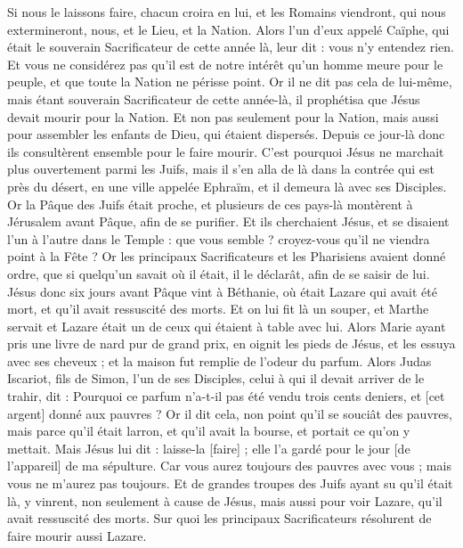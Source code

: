 \begin{multicols}{2}
Si nous le laissons faire, chacun croira en lui, et les Romains viendront, qui nous extermineront, nous, et le Lieu, et la Nation.
Alors l'un d'eux appelé Caïphe, qui était le souverain Sacrificateur de cette année là, leur dit : vous n'y entendez rien.
Et vous ne considérez pas qu'il est de notre intérêt qu'un homme meure pour le peuple, et que toute la Nation ne périsse point.
Or il ne dit pas cela de lui-même, mais étant souverain Sacrificateur de cette année-là, il prophétisa que Jésus devait mourir pour la Nation.
Et non pas seulement pour la Nation, mais aussi pour assembler les enfants de Dieu, qui étaient dispersés.
Depuis ce jour-là donc ils consultèrent ensemble pour le faire mourir.
C'est pourquoi Jésus ne marchait plus ouvertement parmi les Juifs, mais il s'en alla de là dans la contrée qui est près du désert, en une ville appelée Ephraïm, et il demeura là avec ses Disciples.
Or la Pâque des Juifs était proche, et plusieurs de ces pays-là montèrent à Jérusalem avant Pâque, afin de se purifier.
Et ils cherchaient Jésus, et se disaient l'un à l'autre dans le Temple : que vous semble ? croyez-vous qu'il ne viendra point à la Fête ?
Or les principaux Sacrificateurs et les Pharisiens avaient donné ordre, que si quelqu'un savait où il était, il le déclarât, afin de se saisir de lui.
\VerseOne{}Jésus donc six jours avant Pâque vint à Béthanie, où était Lazare qui avait été mort, et qu'il avait ressuscité des morts.
Et on lui fit là un souper, et Marthe servait et Lazare était un de ceux qui étaient à table avec lui.
Alors Marie ayant pris une livre de nard pur de grand prix, en oignit les pieds de Jésus, et les essuya avec ses cheveux ; et la maison fut remplie de l'odeur du parfum.
Alors Judas Iscariot, fils de Simon, l'un de ses Disciples, celui à qui il devait arriver de le trahir, dit :
Pourquoi ce parfum n'a-t-il pas été vendu trois cents deniers, et [cet argent] donné aux pauvres ?
Or il dit cela, non point qu'il se souciât des pauvres, mais parce qu'il était larron, et qu'il avait la bourse, et portait ce qu'on y mettait.
Mais Jésus lui dit : laisse-la [faire] ; elle l'a gardé pour le jour [de l'appareil] de ma sépulture.
Car vous aurez toujours des pauvres avec vous ; mais vous ne m'aurez pas toujours.
Et de grandes troupes des Juifs ayant su qu'il était là, y vinrent, non seulement à cause de Jésus, mais aussi pour voir Lazare, qu'il avait ressuscité des morts.
Sur quoi les principaux Sacrificateurs résolurent de faire mourir aussi Lazare.

\end{multicols}
